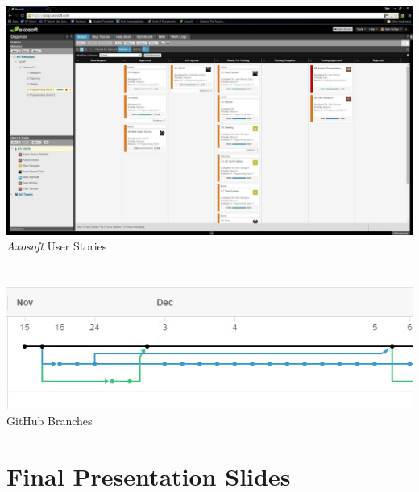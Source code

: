 \documentclass[a4paper]{report}
\begin{document}
\subsection{}
	\includegraphics[width=1.0\linewidth]{./appendixImages/AxosoftScreenShot02}
	\textit{Axosoft} User Stories
\pagebreak
\section{}
\pagebreak
\section{}
\pagebreak
\section{}
\subsection{}
\includegraphics[width=1.0\linewidth]{./appendixImages/GitHubScreenShot01}
GitHub Branches
\pagebreak
\section{}
\pagebreak
\section{Final Presentation Slides}

\end{document}
